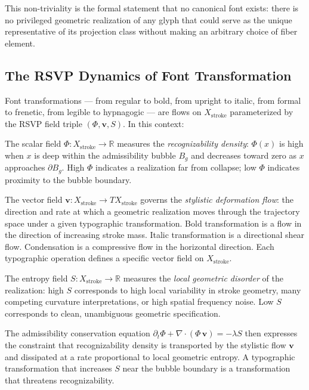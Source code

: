 \documentclass[12pt, a4paper]{article}
\theoremstyle{essaystyle}
\begin{document}
This non-triviality is the formal statement that no canonical font exists: there is no
privileged geometric realization of any glyph that could serve as the unique
representative of its projection class without making an arbitrary choice of
fiber element.

\subsection{The RSVP Dynamics of Font Transformation}

Font transformations — from regular to bold, from upright to italic, from formal to
frenetic, from legible to hypnagogic — are flows on $X_{\mathrm{stroke}}$ parameterized
by the RSVP field triple $(\Phi, \mathbf{v}, S)$. In this context:

The scalar field $\Phi : X_{\mathrm{stroke}} \to \mathbb{R}$ measures the
\emph{recognizability density}: $\Phi(x)$ is high when $x$ is deep within the
admissibility bubble $B_g$ and decreases toward zero as $x$ approaches $\partial B_g$.
High $\Phi$ indicates a realization far from collapse; low $\Phi$ indicates proximity
to the bubble boundary.

The vector field $\mathbf{v} : X_{\mathrm{stroke}} \to TX_{\mathrm{stroke}}$ governs
the \emph{stylistic deformation flow}: the direction and rate at which a geometric
realization moves through the trajectory space under a given typographic transformation.
Bold transformation is a flow in the direction of increasing stroke mass. Italic
transformation is a directional shear flow. Condensation is a compressive flow in
the horizontal direction. Each typographic operation defines a specific vector field
on $X_{\mathrm{stroke}}$.

The entropy field $S : X_{\mathrm{stroke}} \to \mathbb{R}$ measures the \emph{local
geometric disorder} of the realization: high $S$ corresponds to high local variability
in stroke geometry, many competing curvature interpretations, or high spatial frequency
noise. Low $S$ corresponds to clean, unambiguous geometric specification.

The admissibility conservation equation $\partial_t \Phi + \nabla \cdot (\Phi\,\mathbf{v})
= -\lambda S$ then expresses the constraint that recognizability density is transported
by the stylistic flow $\mathbf{v}$ and dissipated at a rate proportional to local
geometric entropy. A typographic transformation that increases $S$ near the bubble
boundary is a transformation that threatens recognizability.
\end{document}
